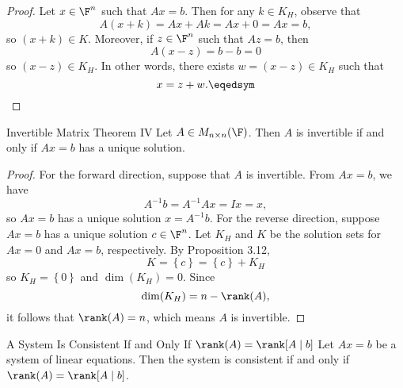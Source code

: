 \documentclass[linearalgebra]{subfiles}
\begin{document}
    \begin{proof}
        Let $x\in \F^n$ such that $Ax=b$. Then for any $k\in K_H$, observe that
        \begin{equation*}
            A(x+k) = Ax+Ak = Ax + 0 = Ax = b,
        \end{equation*}
        so $(x+k)\in K$. Moreover, if $z\in \F^n$ such that $Az = b$, then
        \begin{equation*}
            A(x-z) = b-b = 0
        \end{equation*}
        so $(x-z)\in K_H$. In other words, there exists $w = (x-z)\in K_H$ such that
        \begin{equation*}
            x = z + w. \eqedsym
        \end{equation*}
    \end{proof}

    \begin{theorem}{Invertible Matrix Theorem IV}
        Let $A\in M_{n\times n}(\F)$. Then $A$ is invertible if and only if $Ax=b$ has a unique solution.
    \end{theorem}

    \begin{proof}
        For the forward direction, suppose that $A$ is invertible. From $Ax=b$, we have
        \begin{equation*}
            A^{-1}b = A^{-1}Ax = Ix = x,
        \end{equation*}
        so $Ax=b$ has a unique solution $x=A^{-1}b$. For the reverse direction, suppose $Ax=b$ has a unique solution $c\in \F^n$. Let $K_H$ and $K$ be the solution sets for $Ax=0$ and $Ax=b$, respectively. By Proposition 3.12,
        \begin{equation*}
            K = \left\lbrace c \right\rbrace = \left\lbrace c \right\rbrace + K_H
        \end{equation*}
        so $K_H = \left\lbrace 0 \right\rbrace$ and $\dim(K_H) = 0$. Since
        \begin{equation*}
            \dim(K_H) = n - \rank(A),
        \end{equation*}
        it follows that $\rank(A) = n$, which means $A$ is invertible.
    \end{proof}

    \begin{prop}{A System Is Consistent If and Only If $\rank(A) = \rank [A\mid b]$}
        Let $Ax = b$ be a system of linear equations. Then the system is consistent if and only if $\rank(A) = \rank[A\mid b]$.
    \end{prop}
\end{document}
